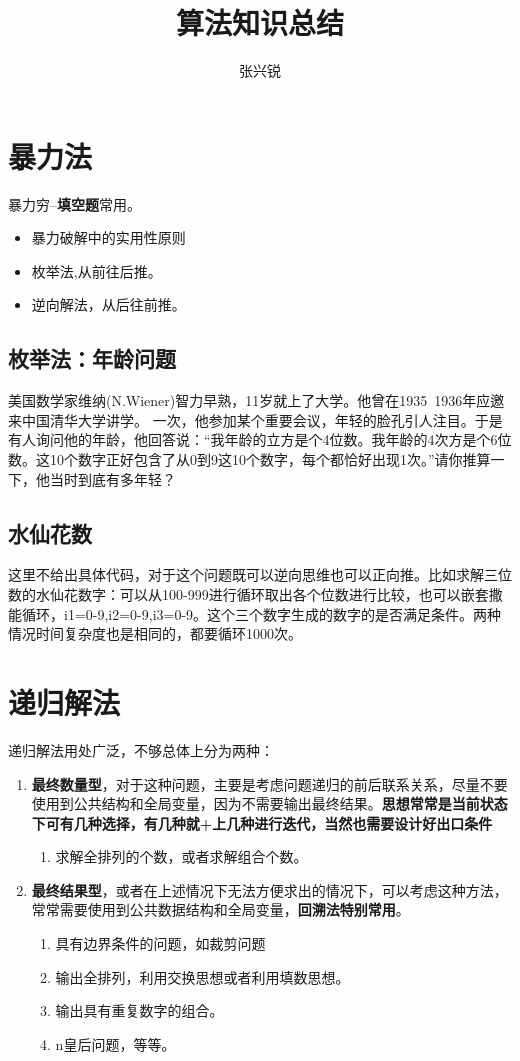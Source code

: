 \documentclass[a4paper]{article}
\title{算法知识总结}
\author{张兴锐}
\begin{document}
	\maketitle
	\tableofcontents
	
	\section{暴力法}
	暴力穷--\textbf{填空题}常用。
	\begin{itemize}
		\item 暴力破解中的实用性原则
		\item 枚举法,从前往后推。
		\item 逆向解法，从后往前推。
	\end{itemize}
	\subsection{枚举法：年龄问题}
	美国数学家维纳(N.Wiener)智力早熟，11岁就上了大学。他曾在1935~1936年应邀来中国清华大学讲学。
	一次，他参加某个重要会议，年轻的脸孔引人注目。于是有人询问他的年龄，他回答说：“我年龄的立方是个4位数。我年龄的4次方是个6位数。这10个数字正好包含了从0到9这10个数字，每个都恰好出现1次。”请你推算一下，他当时到底有多年轻？
	
	\subsection{水仙花数}
	这里不给出具体代码，对于这个问题既可以逆向思维也可以正向推。比如求解三位数的水仙花数字：可以从100-999进行循环取出各个位数进行比较，也可以嵌套撒能循环，i1=0-9,i2=0-9,i3=0-9。这个三个数字生成的数字的是否满足条件。两种情况时间复杂度也是相同的，都要循环1000次。
	\section{递归解法}
	递归解法用处广泛，不够总体上分为两种：
	\begin{enumerate}
		\item \textbf{最终数量型}，对于这种问题，主要是考虑问题递归的前后联系关系，尽量不要使用到公共结构和全局变量，因为不需要输出最终结果。\textbf{思想常常是当前状态下可有几种选择，有几种就+上几种进行迭代，当然也需要设计好出口条件}
		\begin{enumerate}
			\item 求解全排列的个数，或者求解组合个数。
		\end{enumerate}
		\item \textbf{最终结果型}，或者在上述情况下无法方便求出的情况下，可以考虑这种方法，常常需要使用到公共数据结构和全局变量，\textbf{回溯法特别常用}。
		\begin{enumerate}
			\item 具有边界条件的问题，如裁剪问题
			\item 输出全排列，利用交换思想或者利用填数思想。
			\item 输出具有重复数字的组合。
			\item n皇后问题，等等。
		\end{enumerate}
	\end{enumerate}
\end{document}
